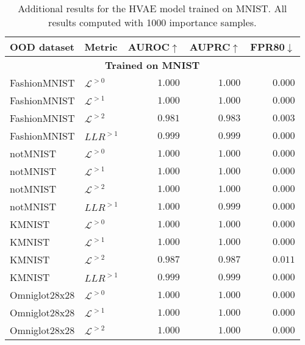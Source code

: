 {\begin{table}[t]
    \caption[Additional results for the HVAE model trained on MNIST.]{Additional results for the HVAE model trained on MNIST. All results computed with 1000 importance samples.}
    \label{tab_hierarchical:additional-results-mnist}
    \centering
    \begin{tabular}{llrrr}
        \toprule
         OOD dataset & Metric & AUROC$\uparrow$ & AUPRC$\uparrow$ & FPR80$\downarrow$ \\
         \midrule
         \multicolumn{5}{c}{\textbf{Trained on MNIST}} \\
         \midrule
FashionMNIST                     &  $\mathcal{L}^{>0}$  &  $1.000$  &  $1.000$  &  $0.000$ \\
FashionMNIST                     &  $\mathcal{L}^{>1}$  &  $1.000$  &  $1.000$  &  $0.000$ \\
FashionMNIST                     &  $\mathcal{L}^{>2}$  &  $0.981$  &  $0.983$  &  $0.003$ \\
FashionMNIST                   &  $LLR^{>1}$  &  $0.999$  &  $0.999$  &  $0.000$ \\
\midrule
notMNIST                         &  $\mathcal{L}^{>0}$  &  $1.000$  &  $1.000$  &  $0.000$ \\
notMNIST                         &  $\mathcal{L}^{>1}$  &  $1.000$  &  $1.000$  &  $0.000$ \\
notMNIST                         &  $\mathcal{L}^{>2}$  &  $1.000$  &  $1.000$  &  $0.000$ \\
notMNIST                       &  $LLR^{>1}$  &  $1.000$  &  $0.999$  &  $0.000$ \\
\midrule
KMNIST                           &  $\mathcal{L}^{>0}$  &  $1.000$  &  $1.000$  &  $0.000$ \\
KMNIST                           &  $\mathcal{L}^{>1}$  &  $1.000$  &  $1.000$  &  $0.000$ \\
KMNIST                           &  $\mathcal{L}^{>2}$  &  $0.987$  &  $0.987$  &  $0.011$ \\
KMNIST                         &  $LLR^{>1}$  &  $0.999$  &  $0.999$  &  $0.000$ \\
\midrule
Omniglot28x28                    &  $\mathcal{L}^{>0}$  &  $1.000$  &  $1.000$  &  $0.000$ \\
Omniglot28x28                    &  $\mathcal{L}^{>1}$  &  $1.000$  &  $1.000$  &  $0.000$ \\
Omniglot28x28                    &  $\mathcal{L}^{>2}$  &  $1.000$  &  $1.000$  &  $0.000$ \\

\end{tabular}
\end{table}}
